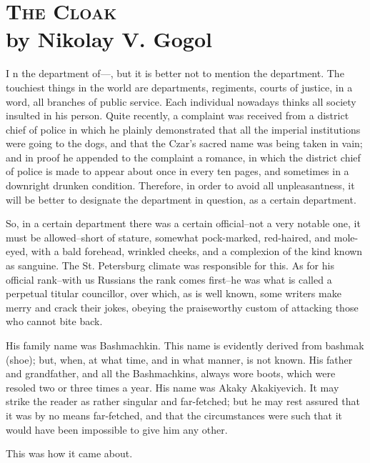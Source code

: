\chapter{\textsc{The Cloak}\\
\small \hspace{20pt} by Nikolay V. Gogol}


\lettrine[lines=3,lhang=0.11,lraise=0,loversize=0.05]{I}{}%
n the department of---, but it is better not to mention the
department. The touchiest things in the world are departments,
regiments, courts of justice, in a word, all branches of public
service. Each individual nowadays thinks all society insulted in his
person. Quite recently, a complaint was received from a district chief
of police in which he plainly demonstrated that all the imperial
institutions were going to the dogs, and that the Czar's sacred name
was being taken in vain; and in proof he appended to the complaint a
romance, in which the district chief of police is made to appear about
once in every ten pages, and sometimes in a downright drunken
condition. Therefore, in order to avoid all unpleasantness, it will be
better to designate the department in question, as a certain
department.

So, in a certain department there was a certain official--not a very
notable one, it must be allowed--short of stature, somewhat
pock-marked, red-haired, and mole-eyed, with a bald forehead, wrinkled
cheeks, and a complexion of the kind known as sanguine. The St.
Petersburg climate was responsible for this. As for his official
rank--with us Russians the rank comes first--he was what is called a
perpetual titular councillor, over which, as is well known, some
writers make merry and crack their jokes, obeying the praiseworthy
custom of attacking those who cannot bite back.

His family name was Bashmachkin. This name is evidently derived from
bashmak (shoe); but, when, at what time, and in what manner, is not
known. His father and grandfather, and all the Bashmachkins, always
wore boots, which were resoled two or three times a year. His name was
Akaky Akakiyevich. It may strike the reader as rather singular and
far-fetched; but he may rest assured that it was by no means
far-fetched, and that the circumstances were such that it would have
been impossible to give him any other.

This was how it came about.

